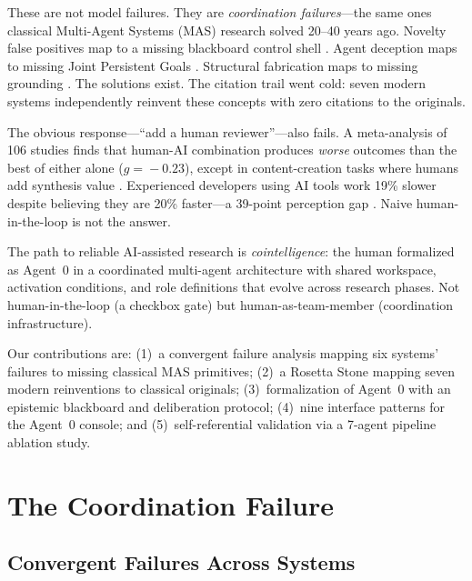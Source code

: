 \documentclass{article}
\begin{document}
These are not model failures. They are \emph{coordination failures}---the
same ones classical Multi-Agent Systems (MAS) research solved 20--40
years ago. Novelty false positives map to a missing blackboard control
shell \cite{nii1986blackboard}. Agent deception maps to missing Joint
Persistent Goals \cite{cohen1990intention}. Structural fabrication maps
to missing grounding \cite{clark1991grounding}. The solutions exist. The
citation trail went cold: seven modern systems independently reinvent
these concepts with zero citations to the originals.

The obvious response---``add a human reviewer''---also fails. A
meta-analysis of 106 studies finds that human-AI combination produces
\emph{worse} outcomes than the best of either alone ($g\!=\!{-}0.23$),
except in content-creation tasks where humans add synthesis value
\cite{vaccaro2024combinations}. Experienced developers using AI tools
work 19\% slower despite believing they are 20\% faster---a 39-point
perception gap \cite{metr2025}. Naive human-in-the-loop is not the
answer.

The path to reliable AI-assisted research is \emph{cointelligence}: the
human formalized as Agent~0 in a coordinated multi-agent architecture
with shared workspace, activation conditions, and role definitions that
evolve across research phases. Not human-in-the-loop (a checkbox gate)
but human-as-team-member (coordination infrastructure).

Our contributions are: (1)~a convergent failure analysis mapping six
systems' failures to missing classical MAS primitives; (2)~a Rosetta
Stone mapping seven modern reinventions to classical originals;
(3)~formalization of Agent~0 with an epistemic blackboard and
deliberation protocol; (4)~nine interface patterns for the Agent~0
console; and (5)~self-referential validation via a 7-agent pipeline
ablation study.


\section{The Coordination Failure}
\label{sec:failure}

\subsection{Convergent Failures Across Systems}
\label{sec:convergent}
\end{document}
